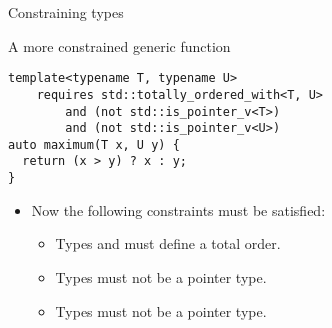 \begin{frame}[t,fragile]{Constraining types}
\begin{block}{A more constrained generic function}
\begin{lstlisting}
template<typename T, typename U>
    requires std::totally_ordered_with<T, U>
        and (not std::is_pointer_v<T>)
        and (not std::is_pointer_v<U>)
auto maximum(T x, U y) {
  return (x > y) ? x : y;
}
\end{lstlisting}
\end{block}

\begin{itemize}
  \item Now the following constraints must be satisfied:
    \begin{itemize}
      \item Types  and  must define a total order.
      \item Types  must not be a pointer type.
      \item Types  must not be a pointer type.
    \end{itemize}
\end{itemize}
\end{frame}
